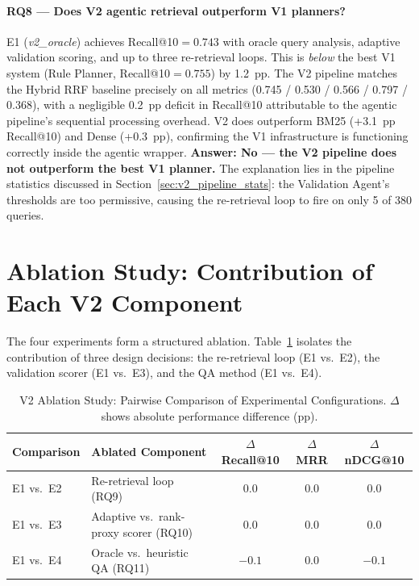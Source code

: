 \FloatBarrier

\paragraph{RQ8 --- Does V2 agentic retrieval outperform V1 planners?}

E1 (\textit{v2\_oracle}) achieves Recall@10$={0.743}$ with oracle query analysis, adaptive validation scoring, and up to three re-retrieval loops. This is \emph{below} the best V1 system (Rule Planner, Recall@10$={0.755}$) by 1.2~pp. The V2 pipeline matches the Hybrid RRF baseline precisely on all metrics (0.745 / 0.530 / 0.566 / 0.797 / 0.368), with a negligible 0.2~pp deficit in Recall@10 attributable to the agentic pipeline's sequential processing overhead. V2 does outperform BM25 (+3.1~pp Recall@10) and Dense (+0.3~pp), confirming the V1 infrastructure is functioning correctly inside the agentic wrapper. \textbf{Answer: No --- the V2 pipeline does not outperform the best V1 planner.} The explanation lies in the pipeline statistics discussed in Section~\ref{sec:v2_pipeline_stats}: the Validation Agent's thresholds are too permissive, causing the re-retrieval loop to fire on only 5 of 380 queries.


\section{Ablation Study: Contribution of Each V2 Component}
\label{sec:v2_ablation}

The four experiments form a structured ablation. Table~\ref{tab:v2_ablation} isolates the contribution of three design decisions: the re-retrieval loop (E1 vs.\ E2), the validation scorer (E1 vs.\ E3), and the QA method (E1 vs.\ E4).

\begin{table}[htbp]
\centering
\caption{V2 Ablation Study: Pairwise Comparison of Experimental Configurations. $\Delta$ shows absolute performance difference (pp).}
\label{tab:v2_ablation}
\begin{tabular}{llccc}
\toprule
\textbf{Comparison} & \textbf{Ablated Component} & \textbf{$\Delta$ Recall@10} & \textbf{$\Delta$ MRR} & \textbf{$\Delta$ nDCG@10} \\
\midrule
E1 vs.\ E2 & Re-retrieval loop (RQ9) & $0.0$ & $0.0$ & $0.0$ \\
E1 vs.\ E3 & Adaptive vs.\ rank-proxy scorer (RQ10) & $0.0$ & $0.0$ & $0.0$ \\
E1 vs.\ E4 & Oracle vs.\ heuristic QA (RQ11) & $-0.1$ & $0.0$ & $-0.1$ \\
\bottomrule
\end{tabular}
\end{table}

